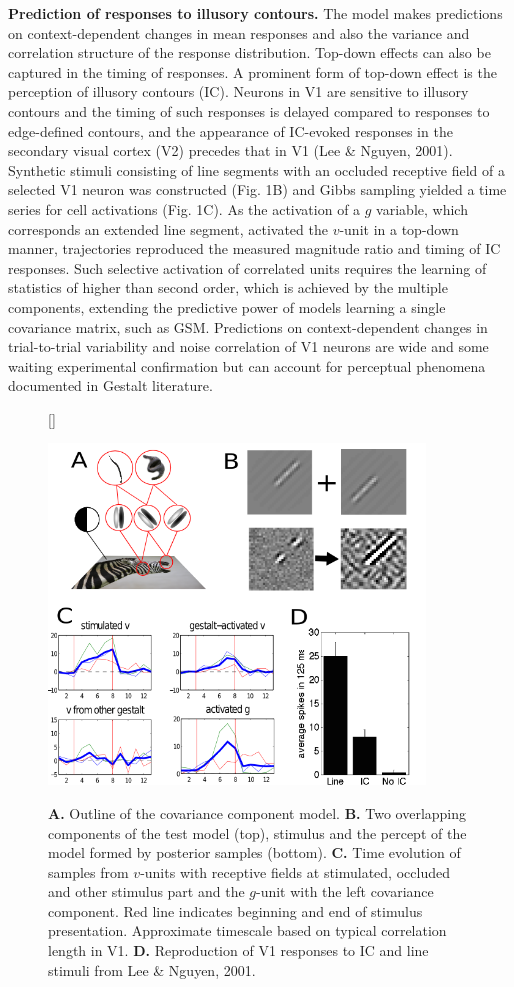 \documentclass[12pt,a4paper]{article}
\begin{document}
{\bf Prediction of responses to illusory contours.} The model makes predictions on context-dependent changes in mean responses and also the variance and correlation structure of the response distribution. Top-down effects can also be captured in the timing of responses. A prominent form of top-down effect is the perception of illusory contours (IC). Neurons in V1 are sensitive to illusory contours and the timing of such responses is delayed compared to responses to edge-defined contours, and the appearance of IC-evoked responses in the secondary visual cortex (V2) precedes that in V1  (Lee \& Nguyen, 2001). Synthetic stimuli consisting of line segments with an  occluded receptive field of a selected V1 neuron  was constructed  (Fig. 1B) and  Gibbs sampling yielded a time series for cell activations (Fig. 1C). As the activation of a $g$ variable, which corresponds an extended line segment,  activated the $v$-unit in a top-down manner,  trajectories reproduced the measured magnitude ratio and timing of IC responses. Such selective activation of correlated units requires the learning of statistics of higher than second order, which is achieved by the multiple components, extending the predictive power of models learning a single covariance matrix, such as GSM. Predictions on context-dependent changes in trial-to-trial variability and noise correlation of V1 neurons are wide and some waiting experimental confirmation but can account for perceptual phenomena documented in
 Gestalt literature. 

\begin{figure}[h]
[\FBwidth]
{\caption{{\bf A.} Outline of the covariance component model. {\bf B.} Two overlapping components of the test model (top),  stimulus and the percept of the model formed by posterior samples (bottom). {\bf C.} Time evolution of samples from $v$-units with receptive fields at stimulated, occluded and other stimulus part and the $g$-unit with the left covariance component. Red line indicates beginning and end of stimulus presentation. Approximate timescale based on typical correlation length in V1. {\bf D.} Reproduction of V1 responses to IC and line stimuli from Lee \& Nguyen, 2001.
}\label{fig:test}}
{\includegraphics[width=10cm]{cosyne_figure.png}}
\end{figure}
\end{document}
